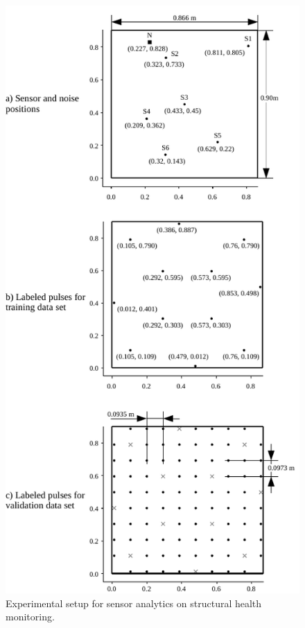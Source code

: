 \begin{figure}[t!]
	\centering
	\includegraphics[width=\columnwidth]{../figures/histograms/data_set.pdf}
	\caption{Experimental setup for sensor analytics on structural health monitoring.}
	\label{fig:data_set}
\end{figure}

